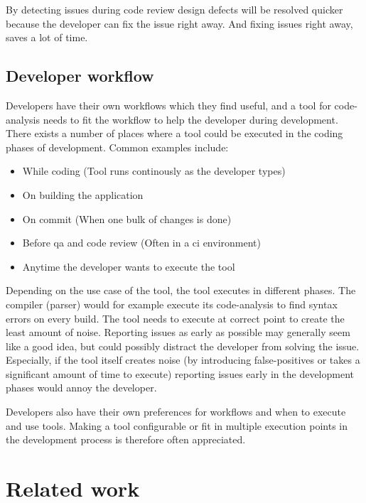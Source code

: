 \documentclass{report}
\begin{document}
By detecting issues during code review design defects will be resolved quicker because the developer can fix the issue right away. And fixing issues right away, saves a lot of time.

\section{Developer workflow}

Developers have their own workflows which they find useful, and a tool for code-analysis needs to fit the workflow to help the developer during development. There exists a number of places where a tool could be executed in the coding phases of development. Common examples include:
\begin{itemize}
    \item While coding (Tool runs continously as the developer types)
    \item On building the application 
    \item On commit (When one bulk of changes is done)
    \item Before \gls{qa} and code review (Often in a \gls{ci} environment)
    \item Anytime the developer wants to execute the tool
\end{itemize}

Depending on the use case of the tool, the tool executes in different phases. The compiler (parser) would for example execute its code-analysis to find syntax errors on every build. The tool needs to execute at correct point to create the least amount of noise. Reporting issues as early as possible may generally seem like a good idea, but could possibly distract the developer from solving the issue. Especially, if the tool itself creates noise (by introducing false-positives or takes a significant amount of time to execute) reporting issues early in the development phases would annoy the developer. 

Developers also have their own preferences for workflows and when to execute and use tools. Making a tool configurable or fit in multiple execution points in the development process is therefore often appreciated.

\chapter{Related work}
\label{relatedwork}
\end{document}
